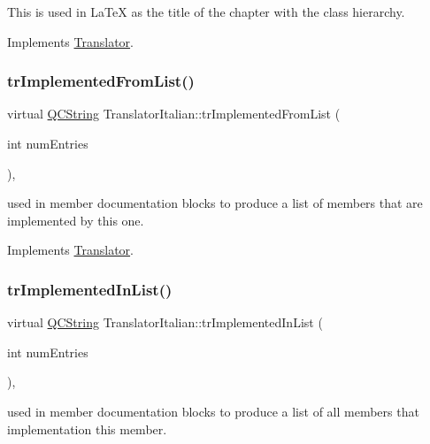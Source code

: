 This is used in La\+TeX as the title of the chapter with the class hierarchy. 

Implements \mbox{\hyperlink{class_translator}{Translator}}.

\mbox{\label{class_translator_italian_a504b7730745570dd0ec3a61b3c9c5571}} 
\subsubsection{\texorpdfstring{trImplementedFromList()}{trImplementedFromList()}}
{\footnotesize\ttfamily virtual \mbox{\hyperlink{class_q_c_string}{Q\+C\+String}} Translator\+Italian\+::tr\+Implemented\+From\+List (\begin{DoxyParamCaption}\item[{int}]{num\+Entries }\end{DoxyParamCaption})\hspace{0.3cm}{\ttfamily [inline]}, {\ttfamily [virtual]}}

used in member documentation blocks to produce a list of members that are implemented by this one. 

Implements \mbox{\hyperlink{class_translator}{Translator}}.

\mbox{\label{class_translator_italian_a4a288c19bf1812c56fd6812dad2b178b}} 
\subsubsection{\texorpdfstring{trImplementedInList()}{trImplementedInList()}}
{\footnotesize\ttfamily virtual \mbox{\hyperlink{class_q_c_string}{Q\+C\+String}} Translator\+Italian\+::tr\+Implemented\+In\+List (\begin{DoxyParamCaption}\item[{int}]{num\+Entries }\end{DoxyParamCaption})\hspace{0.3cm}{\ttfamily [inline]}, {\ttfamily [virtual]}}

used in member documentation blocks to produce a list of all members that implementation this member. 

